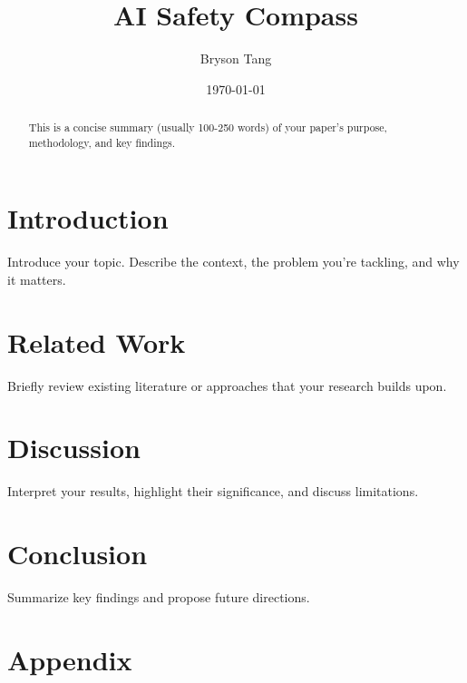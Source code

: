 \documentclass[11pt]{article}
\title{AI Safety Compass}
\author{Bryson Tang}
\date{\today}
\begin{document}
\maketitle

\begin{abstract}
This is a concise summary (usually 100-250 words) of your paper's purpose, methodology, and key findings.
\end{abstract}

\section{Introduction}
Introduce your topic. Describe the context, the problem you're tackling, and why it matters.

\section{Related Work}
Briefly review existing literature or approaches that your research builds upon.





\section{Discussion}
Interpret your results, highlight their significance, and discuss limitations.

\section{Conclusion}
Summarize key findings and propose future directions.

% 
% 

\newpage
\appendix
\section*{Appendix}

\end{document}
